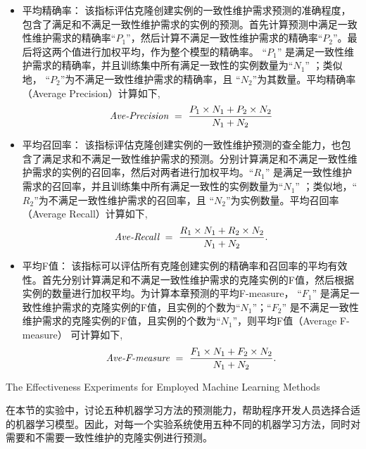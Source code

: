 \begin{itemize}

\item
平均精确率：
 该指标评估克隆创建实例的一致性维护需求预测的准确程度，包含了满足和不满足一致性维护需求的实例的预测。首先计算预测中满足一致性维护需求的精确率``$P_1$''，然后计算不满足一致性维护需求的精确率``$P_2$''。最后将这两个值进行加权平均，作为整个模型的精确率。 ``$P_1$'' 是满足一致性维护需求的精确率，并且训练集中所有满足一致性的实例数量为``$N_1$'' ；类似地， ``$P_2$''为不满足一致性维护需求的精确率，且 ``$N_2$''为其数量。平均精确率（Average Precision）计算如下,
\begin{equation} 
\mbox{\it Ave-Precision} ~=~ {\frac {P_1 \times N_1 + P_2 \times N_2}{N_1 + N_2}}
\end{equation}

\item
平均召回率：
该指标评估克隆创建实例的一致性维护预测的查全能力，也包含了满足求和不满足一致性维护需求的预测。分别计算满足和不满足一致性维护需求的实例的召回率，然后对两者进行加权平均。“$R_1$” 是满足一致性维护需求的召回率，并且训练集中所有满足一致性的实例数量为“$N_1$” ；类似地，“$R_2$”为不满足一致性维护需求的召回率，且 “$N_2$”为实例数量。平均召回率（Average Recall）计算如下,
\begin{equation} 
\mbox{\it Ave-Recall} ~=~ {\frac  {R_1 \times N_1 + R_2 \times N_2}{N_1 + N_2}}.
\end{equation}

\item
平均F值：
该指标可以评估所有克隆创建实例的精确率和召回率的平均有效性。首先分别计算满足和不满足一致性维护需求的克隆实例的F值，然后根据实例的数量进行加权平均。为计算本章预测的平均F-measure， ``$F_1$'' 是满足一致性维护需求的克隆实例的F值，且实例的个数为``$N_1$''；``$F_2$'' 是不满足一致性维护需求的克隆实例的F值，且实例的个数为``$N_1$''，则平均F值（Average F-measure） 可计算如下,
\begin{equation} 
\mbox{\it Ave-F-measure} ~=~ {\frac  {F_1 \times N_1 + F_2 \times N_2}{N_1 + N_2}}.
\end{equation}

\end{itemize}

{The Effectiveness Experiments for Employed Machine Learning Methods}

在本节的实验中，讨论五种机器学习方法的预测能力，帮助程序开发人员选择合适的机器学习模型。因此，对每一个实验系统使用五种不同的机器学习方法，同时对需要和不需要一致性维护的克隆实例进行预测。

